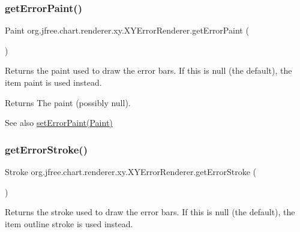 \subsubsection{\texorpdfstring{get\+Error\+Paint()}{getErrorPaint()}}
{\footnotesize\ttfamily Paint org.\+jfree.\+chart.\+renderer.\+xy.\+X\+Y\+Error\+Renderer.\+get\+Error\+Paint (\begin{DoxyParamCaption}{ }\end{DoxyParamCaption})}

Returns the paint used to draw the error bars. If this is {\ttfamily null} (the default), the item paint is used instead.

\begin{DoxyReturn}{Returns}
The paint (possibly {\ttfamily null}).
\end{DoxyReturn}
\begin{DoxySeeAlso}{See also}
\mbox{\hyperlink{classorg_1_1jfree_1_1chart_1_1renderer_1_1xy_1_1_x_y_error_renderer_a561701d3462cbba2ef397c7d8248b4c5}{set\+Error\+Paint(\+Paint)}} 
\end{DoxySeeAlso}
\mbox{\label{classorg_1_1jfree_1_1chart_1_1renderer_1_1xy_1_1_x_y_error_renderer_a217ac2f91bafbe4f294e017c678be249}} 
\subsubsection{\texorpdfstring{get\+Error\+Stroke()}{getErrorStroke()}}
{\footnotesize\ttfamily Stroke org.\+jfree.\+chart.\+renderer.\+xy.\+X\+Y\+Error\+Renderer.\+get\+Error\+Stroke (\begin{DoxyParamCaption}{ }\end{DoxyParamCaption})}

Returns the stroke used to draw the error bars. If this is {\ttfamily null} (the default), the item outline stroke is used instead.

